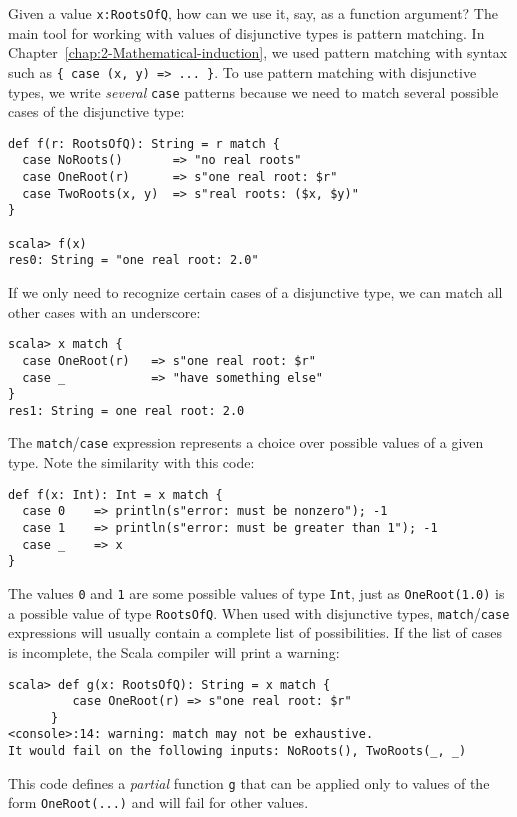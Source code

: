 Given a value \lstinline!x:RootsOfQ!, how can we use it, say, as
a function argument? The main tool for working with values of disjunctive
types is pattern matching. In Chapter~\ref{chap:2-Mathematical-induction},
we used pattern matching with syntax such as \lstinline!{ case (x, y) => ... }!.
To use pattern matching with disjunctive types, we write \emph{several}
\lstinline!case! patterns because we need to match several possible
cases of the disjunctive type:
\begin{lstlisting}
def f(r: RootsOfQ): String = r match {
  case NoRoots()       => "no real roots"
  case OneRoot(r)      => s"one real root: $r"
  case TwoRoots(x, y)  => s"real roots: ($x, $y)"
}

scala> f(x)
res0: String = "one real root: 2.0"
\end{lstlisting}
If we only need to recognize certain cases of a disjunctive type,
we can match all other cases with an underscore:
\begin{lstlisting}
scala> x match {
  case OneRoot(r)   => s"one real root: $r"
  case _            => "have something else"
}
res1: String = one real root: 2.0
\end{lstlisting}
The \lstinline!match!/\lstinline!case! expression represents a choice
over possible values of a given type. Note the similarity with this
code:

\begin{lstlisting}
def f(x: Int): Int = x match {
  case 0    => println(s"error: must be nonzero"); -1
  case 1    => println(s"error: must be greater than 1"); -1
  case _    => x
}
\end{lstlisting}
The values \lstinline!0! and \lstinline!1! are some possible values
of type \lstinline!Int!, just as \lstinline!OneRoot(1.0)! is a possible
value of type \lstinline!RootsOfQ!. When used with disjunctive types,
\lstinline!match!/\lstinline!case! expressions will usually contain
a complete list of possibilities. If the list of cases is incomplete,
the Scala compiler will print a warning:
\begin{lstlisting}
scala> def g(x: RootsOfQ): String = x match {
         case OneRoot(r) => s"one real root: $r"
      }
<console>:14: warning: match may not be exhaustive.
It would fail on the following inputs: NoRoots(), TwoRoots(_, _)
\end{lstlisting}
This code defines a \emph{partial} function
\lstinline!g! that can be applied only to values of the form \lstinline!OneRoot(...)!
and will fail for other values.

